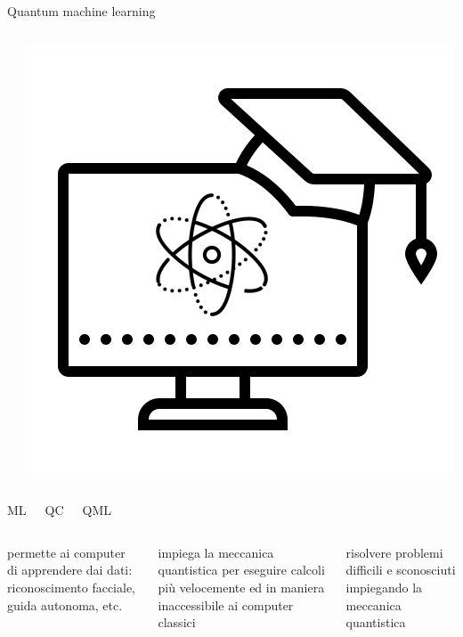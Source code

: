\documentclass{beamer}
\begin{document}
\begin{frame}{Quantum machine learning}
\begin{columns}
\begin{center}
            \end{center}
            \begin{center}
                \includegraphics[width=.8\columnwidth]{gfx/icons/quantum-machine-learning-480.png}
            \end{center}
        \end{columns}
        \begin{columns}
            \begin{center}
                ML
            \end{center}
            \begin{center}
                QC
            \end{center}
            \begin{center}
                QML
            \end{center}
        \end{columns}
        \vspace{.1cm}
        \begin{columns}
            \begin{center}
                permette ai computer di apprendere dai dati: riconoscimento facciale, guida autonoma, etc.
            \end{center}
            \begin{center}
                impiega la meccanica quantistica per eseguire calcoli più velocemente ed in maniera inaccessibile ai computer classici            
            \end{center}
            \begin{center}
                risolvere problemi difficili e sconosciuti impiegando la meccanica quantistica                
            \end{center}
        \end{columns}
    \end{frame}
\end{document}
